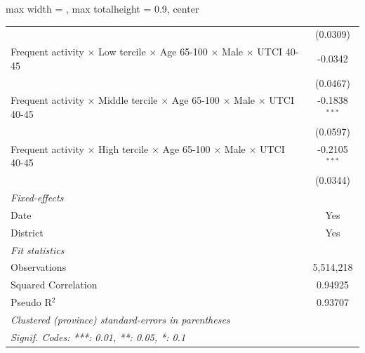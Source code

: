 \begin{table}[htbp]
\begin{adjustbox}{max width = \textwidth, max totalheight = 0.9\textheight, center}
\begin{tabular}{lc}
                                                                                                               & (0.0309)\\   
         Frequent activity $\times$ Low tercile $\times$ Age 65-100 $\times$ Male $\times$ UTCI 40-45          & -0.0342\\   
                                                                                                               & (0.0467)\\   
         Frequent activity $\times$ Middle tercile $\times$ Age 65-100 $\times$ Male $\times$ UTCI 40-45       & -0.1838$^{***}$\\   
                                                                                                               & (0.0597)\\   
         Frequent activity $\times$ High tercile $\times$ Age 65-100 $\times$ Male $\times$ UTCI 40-45         & -0.2105$^{***}$\\   
                                                                                                               & (0.0344)\\   
         \midrule
         \emph{Fixed-effects}\\
         Date                                                                                                  & Yes\\  
         District                                                                                              & Yes\\  
         \midrule
         \emph{Fit statistics}\\
         Observations                                                                                          & 5,514,218\\  
         Squared Correlation                                                                                   & 0.94925\\  
         Pseudo R$^2$                                                                                          & 0.93707\\  
         \midrule \midrule
         \multicolumn{2}{l}{\emph{Clustered (province) standard-errors in parentheses}}\\
         \multicolumn{2}{l}{\emph{Signif. Codes: ***: 0.01, **: 0.05, *: 0.1}}\\
      \end{tabular}
   \end{adjustbox}
\end{table}


